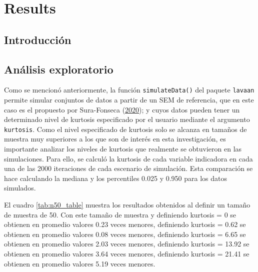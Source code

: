 \documentclass[
  english]{revcoles}
\begin{document}
\section{Results}

\subsection{Introducción}

\subsection{Análisis exploratorio}

Como se mencionó anteriormente, la función \texttt{simulateData()} del
paquete \texttt{lavaan} permite simular conjuntos de datos a partir de
un SEM de referencia, que en este caso es el propuesto por Sura-Fonseca
(\protect\hyperlink{ref-SuraFonseca2020}{2020}); y cuyos datos pueden
tener un determinado nivel de kurtosis especificado por el usuario
mediante el argumento \texttt{kurtosis}. Como el nivel especificado de
kurtosis solo se alcanza en tamaños de muestra muy superiores a los que
son de interés en esta investigación, es importante analizar los niveles
de kurtosis que realmente se obtuvieron en las simulaciones. Para ello,
se calculó la kurtosis de cada variable indicadora en cada una de las
2000 iteraciones de cada escenario de simulación. Esta comparación se
hace calculando la mediana y los percentiles 0.025 y 0.950 para los
datos simulados.

El cuadro \ref{tab:n50_table} muestra los resultados obtenidos al
definir un tamaño de muestra de 50. Con este tamaño de muestra y
definiendo kurtosis = 0 se obtienen en promedio valores 0.23 veces
menores, definiendo kurtosis = 0.62 se obtienen en promedio valores 0.08
veces menores, definiendo kurtosis = 6.65 se obtienen en promedio
valores 2.03 veces menores, definiendo kurtosis = 13.92 se obtienen en
promedio valores 3.64 veces menores, definiendo kurtosis = 21.41 se
obtienen en promedio valores 5.19 veces menores.
\end{document}
